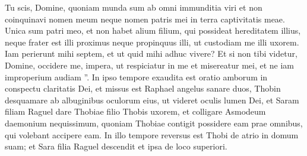 \begin{biblechapter}
\begin{biblechapter}
\begin{biblechapter}
\verse Tu scis, Domine, quoniam munda sum ab omni immunditia viri 
\verse et non coinquinavi nomen meum neque nomen patris mei in terra captivitatis meae. Unica sum patri meo, et non habet alium filium, qui possideat hereditatem illius, neque frater est illi proximus neque propinquus illi, ut custodiam me illi uxorem. Iam perierunt mihi septem, et ut quid mihi adhuc vivere? Et si non tibi videtur, Domine, occidere me, impera, ut respiciatur in me et misereatur mei, et ne iam improperium audiam ”.
 \verse In ipso tempore exaudita est oratio amborum in conspectu claritatis Dei, 
 \verse et missus est Raphael angelus sanare duos, Thobin desquamare ab albuginibus oculorum eius, ut videret oculis lumen Dei, et Saram filiam Raguel dare Thobiae filio Thobis uxorem, et colligare Asmodeum daemonium nequissimum, quoniam Thobiae contigit possidere eam prae omnibus, qui volebant accipere eam. In illo tempore reversus est Thobi de atrio in domum suam; et Sara filia Raguel descendit et ipsa de loco superiori.
 

\end{biblechapter}
\end{biblechapter}
\end{biblechapter}

